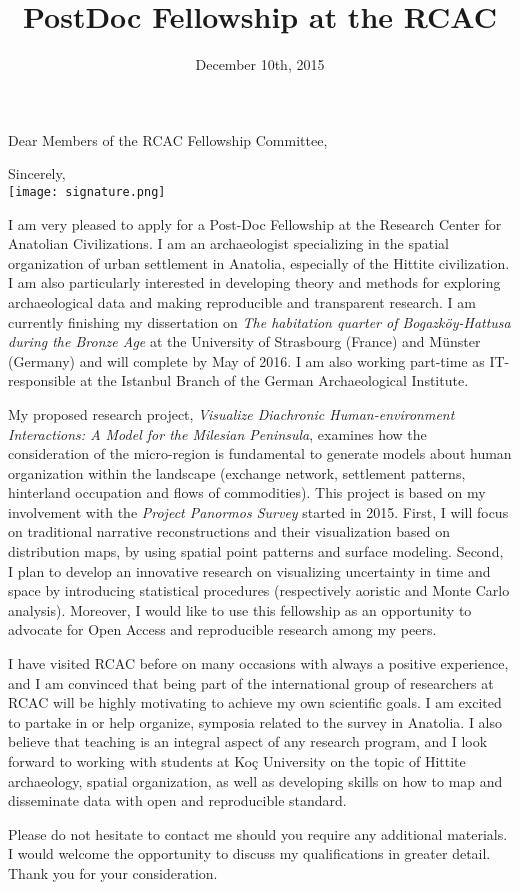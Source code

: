 \documentclass[11pt,a4paper,sans]{moderncv}
\title{PostDoc Fellowship at the RCAC}
\begin{document}

\date{December 10th, 2015}
\opening{Dear Members of the RCAC Fellowship Committee,}
\closing{Sincerely, \\ \vspace{0.5cm} \texttt{[image: signature.png]}}
\makelettertitle

I am very pleased to apply for a Post-Doc Fellowship at the Research Center for
Anatolian Civilizations. I am an archaeologist specializing in the spatial
organization of urban settlement in Anatolia, especially of the Hittite
civilization. I am also particularly interested in developing theory and methods
for exploring archaeological data and making reproducible and transparent
research. I am currently finishing my dissertation on \textit{The habitation quarter
of Bogazköy-Hattusa during the Bronze Age} at the University of Strasbourg
(France) and Münster  (Germany) and will complete by May of 2016. I am also
working part-time as IT-responsible at the Istanbul Branch of the German
Archaeological Institute.

My proposed research project, \textit{Visualize Diachronic Human-environment
Interactions: A Model for the Milesian Peninsula}, examines how the
consideration of the micro-region is fundamental to generate models about human
organization within the landscape (exchange network, settlement patterns,
hinterland occupation and flows of commodities). This project is based on my
involvement with the \textit{Project Panormos Survey} started in 2015.
First, I will focus on traditional narrative reconstructions and their
visualization based on distribution maps, by using spatial point patterns and
surface modeling. Second, I plan to develop an innovative research on
visualizing uncertainty in time and space by introducing statistical procedures
(respectively aoristic and Monte Carlo analysis). Moreover, I would like to use
this fellowship as an opportunity to advocate for Open Access and reproducible
research among my peers. 

I have visited RCAC before on many occasions with always a positive experience,
and I am convinced that being part of the international group of researchers at
RCAC will be highly motivating to achieve my own scientific goals. I am excited
to partake in or  help organize, symposia related to the survey in
Anatolia. I also believe that teaching is an integral aspect of any research
program, and I look forward to working with students at Koç University on the
topic of Hittite archaeology, spatial organization, as well as developing skills on how to
map and disseminate data with open and reproducible standard. 

 
Please do not hesitate to contact me should you require any additional
materials. I would welcome the opportunity to discuss my qualifications in
greater detail. Thank you for your consideration.


\makeletterclosing

\end{document}
